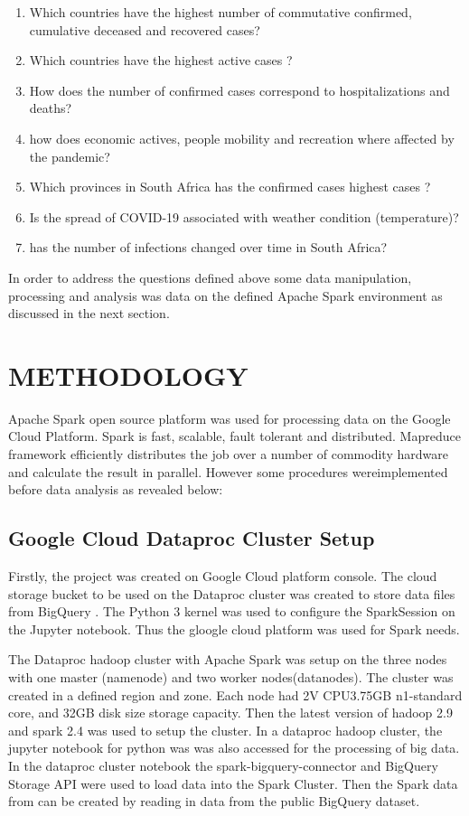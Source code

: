 \documentclass[12pt]{article}
\begin{document}
\begin{enumerate}
    \item Which  countries have the highest number of commutative confirmed, cumulative deceased and recovered cases?
    \item  Which countries have the highest active cases ?
    \item How does the number of confirmed cases correspond to hospitalizations and deaths?
    \item how does economic actives, people mobility and recreation where affected by the pandemic?
    \item Which provinces in South Africa has the  confirmed cases highest cases ?
    \item Is the spread of COVID-19 associated with weather condition (temperature)?
    \item has the number of infections changed over time in  South Africa?
\end{enumerate}

In order to address the questions  defined above  some  data manipulation, processing and analysis was data on the defined Apache Spark environment as discussed in the next section.

\section{METHODOLOGY}
Apache Spark open source platform was used for processing data on the Google Cloud Platform. Spark is fast, scalable, fault tolerant and distributed. Mapreduce framework efficiently distributes the job over a number of commodity hardware and calculate the result in parallel. However some procedures wereimplemented before data analysis as revealed below:

\subsection{ Google Cloud Dataproc Cluster Setup}
Firstly, the project was created on Google Cloud platform console. The cloud storage bucket to be used on the Dataproc cluster was created to store data files from BigQuery . The Python 3 kernel was used to configure the SparkSession on the Jupyter notebook.  Thus the gloogle cloud platform was used for Spark needs.

The Dataproc hadoop cluster with Apache Spark was setup on the three nodes with one master (namenode) and two worker nodes(datanodes). The cluster was created in a defined region and zone. Each node had 2V CPU3.75GB n1-standard core, and 32GB disk size storage capacity. Then the latest version of hadoop 2.9 and spark 2.4 was used to setup the cluster. In a dataproc hadoop cluster, the jupyter notebook for python was was also accessed for the processing of big data.  In the dataproc cluster notebook the spark-bigquery-connector and BigQuery Storage API were used to  load data into the Spark Cluster. Then the Spark data from can be created by reading in data from the public BigQuery dataset. 
\end{document}
